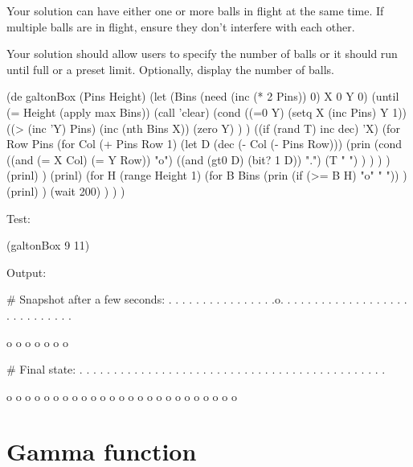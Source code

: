 Your solution can have either one or more balls in flight at the same
time. If multiple balls are in flight, ensure they don't interfere with
each other.

Your solution should allow users to specify the number of balls or it
should run until full or a preset limit. Optionally, display the number
of balls.


\begin{wideverbatim}

(de galtonBox (Pins Height)
   (let (Bins (need (inc (* 2 Pins)) 0)  X 0  Y 0)
      (until (= Height (apply max Bins))
         (call 'clear)
         (cond
            ((=0 Y) (setq X (inc Pins)  Y 1))
            ((> (inc 'Y) Pins)
               (inc (nth Bins X))
               (zero Y) ) )
         ((if (rand T) inc dec) 'X)
         (for Row Pins
            (for Col (+ Pins Row 1)
               (let D (dec (- Col (- Pins Row)))
                  (prin
                     (cond
                        ((and (= X Col) (= Y Row)) "o")
                        ((and (gt0 D) (bit? 1 D)) ".")
                        (T " ") ) ) ) )
            (prinl) )
         (prinl)
         (for H (range Height 1)
            (for B Bins
               (prin (if (>= B H) "o" " ")) )
            (prinl) )
         (wait 200) ) ) )


\end{wideverbatim}

\begin{wideverbatim}

Test:

(galtonBox 9 11)

Output:

# Snapshot after a few seconds:
         .
        . .
       . . .
      . . . .
     . . . . .
    .o. . . . .
   . . . . . . .
  . . . . . . . .
 . . . . . . . . .

        o
        o o
      o o o o

# Final state:
         .
        . .
       . . .
      . . . .
     . . . . .
    . . . . . .
   . . . . . . .
  . . . . . . . .
 . . . . . . . . .

        o
        o
        o
        o
        o
      o o
      o o
      o o
      o o o
      o o o o o
    o o o o o o


\end{wideverbatim}




\pagebreak{}
\section*{Gamma function}

